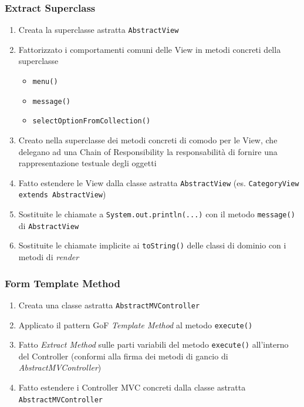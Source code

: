 \begin{frame}
    \frametitle{Extract Superclass}
    \begin{enumerate}
        \item Creata la superclasse astratta \texttt{AbstractView}
        \item Fattorizzato i comportamenti comuni delle View in metodi concreti della superclasse
          \begin{itemize}
              \item \texttt{menu()}
              \item \texttt{message()}
              \item \texttt{selectOptionFromCollection()}
          \end{itemize}
        \item Creato nella superclasse dei metodi concreti di comodo per le View, che delegano ad una Chain of Responsibility la responsabilità
              di fornire una rappresentazione testuale degli oggetti
        \item Fatto estendere le View dalla classe astratta \texttt{AbstractView} (es. \texttt{CategoryView extends AbstractView})
        \item Sostituite le chiamate a \texttt{System.out.println(...)} con il metodo \texttt{message()} di \texttt{AbstractView}
        \item Sostituite le chiamate implicite ai \texttt{toString()} delle classi di dominio con i metodi di \emph{render}
    \end{enumerate}
\end{frame}

\begin{frame}
    \frametitle{Form Template Method}
    \begin{enumerate}
        \item Creata una classe astratta \texttt{AbstractMVController}
        \item Applicato il pattern GoF \emph{Template Method} al metodo \texttt{execute()}
        \item Fatto \emph{Extract Method} sulle parti variabili del metodo \texttt{execute()} all'interno del Controller (conformi alla firma dei metodi di gancio di \emph{AbstractMVController})
        \item Fatto estendere i Controller MVC concreti dalla classe astratta \texttt{AbstractMVController}
    \end{enumerate}
\end{frame}

